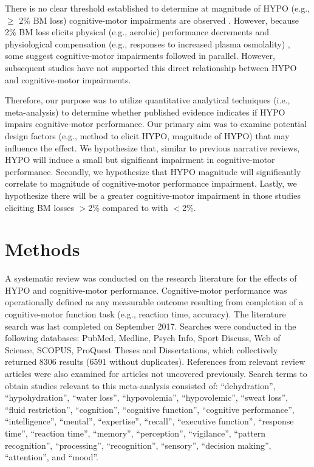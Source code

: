 There is no clear threshold established to determine at magnitude of HYPO (e.g., ${\geq}$  2\% BM loss) cognitive-motor impairments are observed  \cite{gopinathan_role_1988,sharma_influence_1986,sharma_differential_1983}. However, because 2\% BM loss elicits physical (e.g., aerobic) performance decrements \cite{sawka_hypohydration_2015} and physiological compensation (e.g., responses to increased plasma osmolality) \cite{cheuvront_dehydration:_2014}, some suggest cognitive-motor impairments followed in parallel. However, subsequent studies have not supported this direct relationship between HYPO and cognitive-motor impairments. 

Therefore, our purpose was to utilize quantitative analytical techniques (i.e., meta-analysis) to determine whether published evidence indicates if HYPO impairs cognitive-motor performance. Our primary aim was to examine potential design factors (e.g., method to elicit HYPO, magnitude of HYPO) that may influence the effect. We hypothesize that, similar to previous narrative reviews, HYPO will induce a small but significant impairment in cognitive-motor performance. Secondly, we hypothesize that HYPO magnitude will significantly correlate to magnitude of cognitive-motor performance impairment. Lastly, we hypothesize there will be a greater cognitive-motor impairment in those studies eliciting BM losses $>$2\% compared to with $<$2\%.
 
\section{Methods}
A systematic review was conducted on the research literature for the effects of HYPO and cognitive-motor performance. Cognitive-motor performance was operationally defined as any measurable outcome resulting from completion of a cognitive-motor function task (e.g., reaction time, accuracy). The literature search was last completed on September 2017. Searches were conducted in the following databases: PubMed, Medline, Psych Info, Sport Discuss, Web of Science, SCOPUS, ProQuest Theses and Dissertations, which collectively returned 8306 results (6591 without duplicates). References from relevant review articles were also examined \cite{lieberman_hydration_2007,masento_effects_2014,benton_small_2015,nuccio_fluid_2017} for articles not uncovered previously. Search terms to obtain studies relevant to this meta-analysis consisted of: ``dehydration'', ``hypohydration'', ``water loss'', ``hypovolemia'', ``hypovolemic'', ``sweat loss'', ``fluid restriction'', ``cognition'', ``cognitive function'', ``cognitive performance'', ``intelligence'', ``mental'', ``expertise'', ``recall'', ``executive function'', ``response time'', ``reaction time'', ``memory'', ``perception'', ``vigilance'', ``pattern recognition'', ``processing'', ``recognition'', ``sensory'', ``decision making'', ``attention'', and ``mood''. 

